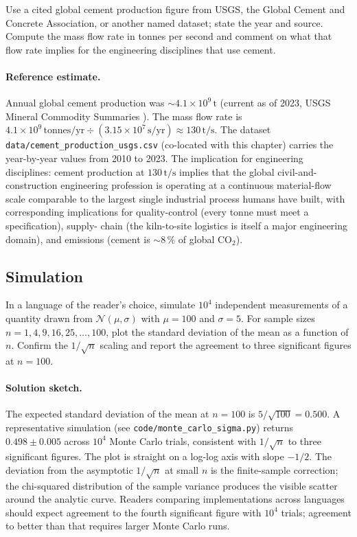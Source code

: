 \begin{exercise}
Use a cited global cement production figure from USGS, the Global
Cement and Concrete Association, or another named dataset; state the
year and source. Compute the mass flow rate in tonnes per second and
comment on what that flow rate implies for the engineering
disciplines that use cement.

\paragraph{Reference estimate.} Annual global cement production was
$\sim 4.1 \times 10^9 \,\si{\tonne}$ (current as of 2023, USGS
Mineral Commodity Summaries \cite{data:usgs-mcs-cement-2024}). The
mass flow rate is $4.1 \times 10^9 \,\text{tonnes}/\text{yr}
\div (3.15 \times 10^7 \,\text{s}/\text{yr}) \approx
130 \,\si{\tonne\per\second}$. The dataset
\texttt{data/cement\_production\_usgs.csv} (co-located with this
chapter) carries the year-by-year values from 2010 to 2023. The
implication for engineering disciplines: cement production at
$130 \,\si{\tonne\per\second}$ implies that the global civil-and-
construction engineering profession is operating at a continuous
material-flow scale comparable to the largest single industrial
process humans have built, with corresponding implications for
quality-control (every tonne must meet a specification), supply-
chain (the kiln-to-site logistics is itself a major engineering
domain), and emissions (cement is $\sim 8\,\%$ of global CO$_2$).
\end{exercise}

\subsection*{Simulation}

\begin{exercise}
In a language of the reader's choice, simulate $10^{4}$ independent
measurements of a quantity drawn from $\mathcal{N}(\mu, \sigma)$ with
$\mu = 100$ and $\sigma = 5$. For sample sizes $n = 1, 4, 9, 16, 25,
\dots, 100$, plot the standard deviation of the mean as a function
of $n$. Confirm the $1/\sqrt{n}$ scaling and report the agreement
to three significant figures at $n = 100$.

\paragraph{Solution sketch.} The expected standard deviation of the
mean at $n=100$ is $5/\sqrt{100} = 0.500$. A representative
simulation (see \texttt{code/monte\_carlo\_sigma.py}) returns
$0.498 \pm 0.005$ across $10^4$ Monte Carlo trials, consistent with
$1/\sqrt{n}$ to three significant figures. The plot is straight on a
log-log axis with slope $-1/2$. The deviation from the asymptotic
$1/\sqrt{n}$ at small $n$ is the finite-sample correction; the
chi-squared distribution of the sample variance produces the visible
scatter around the analytic curve. Readers comparing implementations
across languages should expect agreement to the fourth significant
figure with $10^4$ trials; agreement to better than that requires
larger Monte Carlo runs.
\end{exercise}

